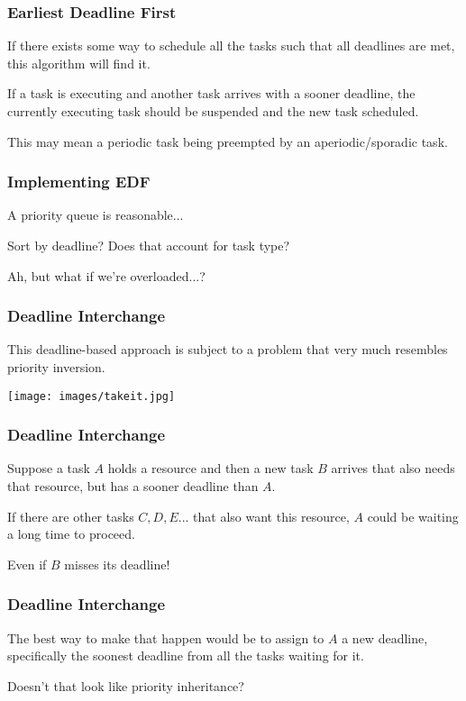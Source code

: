 \begin{frame}
\frametitle{Earliest Deadline First}

If there exists some way to schedule all the tasks such that all deadlines are met, this algorithm will find it. 

If a task is executing and another task arrives with a sooner deadline, the currently executing task should be suspended and the new task scheduled. 

This may mean a periodic task being preempted by an aperiodic/sporadic task.

\end{frame}

\begin{frame}
\frametitle{Implementing EDF}

A priority queue is reasonable...

Sort by deadline? Does that account for task type?

Ah, but what if we're overloaded...?

\end{frame}

\begin{frame}
\frametitle{Deadline Interchange}

This deadline-based approach is subject to a problem that very much resembles priority inversion.

\begin{center}
	\texttt{[image: images/takeit.jpg]}
\end{center}

\end{frame}

\begin{frame}
\frametitle{Deadline Interchange}
Suppose a task $A$ holds a resource and then a new task $B$ arrives that also needs that resource, but has a sooner deadline than $A$. 

If there are other tasks $C, D, E$... that also want this resource, $A$ could be waiting a long time to proceed.

Even if $B$ misses its deadline!

\end{frame}

\begin{frame}
\frametitle{Deadline Interchange}

The best way to make that happen would be to assign to $A$ a new deadline, specifically the soonest deadline from all the tasks waiting for it. 

Doesn't that look like priority inheritance?

\end{frame}


